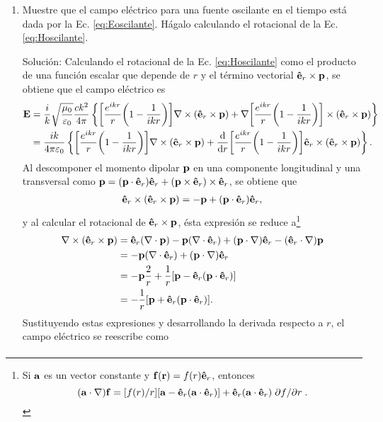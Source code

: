 \begin{enumerate}[label=\textbf{Ejercicio \thechapter.\arabic*},resume]
\item Muestre que el campo eléctrico para una fuente oscilante en el tiempo está dada por la Ec. \eqref{eq:Eoscilante}. Hágalo calculando el rotacional de la Ec.  \eqref{eq:Hoscilante}.
\label{ex:Eoscilante}
\item[\color{blue} Solución:]
	Calculando el rotacional de la Ec. \eqref{eq:Hoscilante} como el producto de una función escalar que depende de $r$ y el término vectorial $\vu{e}_r\times\vb{p}$, se obtiene que el campo eléctrico es
	\begin{align*}
	\vb{E} &= \frac{i}{k}\sqrt{\frac{\mu_0}{\varepsilon_0}} \frac{ck^2}{4\pi}\left\{
		\qty[\frac{e^{ikr}}{r}\qty(1-\frac{1}{ikr})]\nabla\times(\vu{e}_r\times\vb{p}) +
	\nabla\qty[\frac{e^{ikr}}{r}\qty(1-\frac{1}{ikr})]\times(\vu{e}_r\times\vb{p}) 
	\right\}\\
		&= \frac{ik}{4\pi\varepsilon_0}\left\{
		\qty[\frac{e^{ikr}}{r}\qty(1-\frac{1}{ikr})]\nabla\times(\vu{e}_r\times\vb{p}) +
	\dv{r}\qty[\frac{e^{ikr}}{r}\qty(1-\frac{1}{ikr})]\vu{e}_r\times(\vu{e}_r\times\vb{p}) 
	\right\}.
	\end{align*}
%
Al descomponer el momento dipolar $\vb{p}$ en una componente longitudinal y una transversal como $\vb{p} = (\vb{p}\cdot\vu{e}_r)\vu{e}_r + (\vb{p}\times\vu{e}_r)\times\vu{e}_r $, se obtiene que
%
\begin{align*}
	\vu{e}_r \times (\vu{e}_r \times \vb{p}) = - \vb{p} +  (\vb{p}\cdot\vu{e}_r)\vu{e}_r,
\end{align*}
%
y al calcular el rotacional de $\vu{e}_r\times\vb{p}$, ésta expresión se reduce a\footnote{Si $\vb{a}$ es un vector constante y $\vb{f}(\vb{r})=f(r)\vu{e}_r$, entonces \cite{jackson1999electrodynamics} $$(\vb{a}\cdot\nabla)\vb{f} = [f(r)/r][\vb{a}-\vu{e}_r(\vb{a}\cdot\vu{e}_r)]+\vu{e}_r(\vb{a}\cdot\vu{e}_r)\pdv*{f}{r}.$$}
%
\begin{align*}
\nabla\times (\vu{e}_r\times\vb{p}) &= \vu{e}_r(\nabla\cdot\vb{p}) - \vb{p}(\nabla\cdot\vu{e}_r) + (\vb{p}\cdot\nabla)\vu{e}_r-(\vu{e}_r\cdot\nabla)\vb{p}\\
	&=  - \vb{p}(\nabla\cdot\vu{e}_r) + (\vb{p}\cdot\nabla)\vu{e}_r\\
	&= -\vb{p}\frac{2}{r} + \frac{1}{r}\qty[\vb{p}-\vu{e}_r(\vb{p}\cdot\vu{e}_r)]\\
	&= -\frac{1}{r}[\vb{p}+\vu{e}_r(\vb{p}\cdot\vu{e}_r)].
\end{align*}
%
Sustituyendo estas expresiones y desarrollando la derivada respecto a $r$, el campo eléctrico se reescribe como
%
\begin{align*}

\end{align*}
\end{enumerate}
